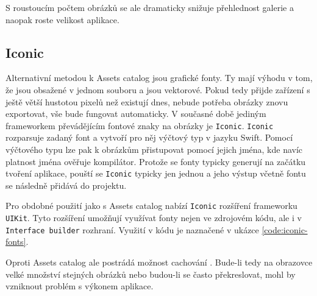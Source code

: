 S roustoucím počtem obrázků se ale dramaticky snižuje přehlednost galerie a naopak roste velikost aplikace.

\subsection{Iconic}

Alternativní metodou k Assets catalog jsou grafické fonty.
Ty mají výhodu v tom, že jsou obsažené v jednom souboru a jsou vektorové.
Pokud tedy přijde zařízení s ještě větší hustotou pixelů než existují dnes, nebude potřeba obrázky znovu exportovat, vše bude fungovat automaticky.
V současné době jediným frameworkem převádějícím fontové znaky na obrázky je \texttt{Iconic}.
\texttt{Iconic} rozparsuje zadaný font a vytvoří pro něj výčtový typ v jazyku Swift.
Pomocí výčtového typu lze pak k obrázkům přistupovat pomocí jejich jména, kde navíc platnost jména ověřuje kompilátor.
Protože se fonty typicky generují na začátku tvoření aplikace, pouští se \texttt{Iconic} typicky jen jednou a jeho výstup včetně fontu se následně přidává do projektu.

Pro obdobné použití jako s Assets catalog nabízí \texttt{Iconic} rozšíření frameworku \texttt{UIKit}.
Tyto rozšíření umožňují využívat fonty nejen ve zdrojovém kódu, ale i v \texttt{Interface builder} rozhraní.
Využití v kódu je naznačené v ukázce \ref{code:iconic-fonts}.


Oproti Assets catalog ale postrádá možnost cachování \cite{github-iconic-cache}.
Bude-li tedy na obrazovce velké množství stejných obrázků nebo budou-li se často překreslovat, mohl by vzniknout problém s výkonem aplikace.
